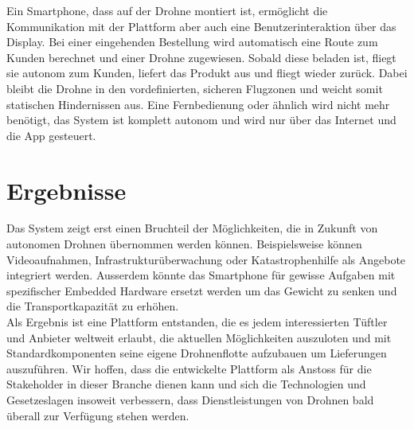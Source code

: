 Ein Smartphone, dass auf der Drohne montiert ist, ermöglicht die Kommunikation mit der Plattform aber auch eine Benutzerinteraktion über das Display. Bei einer eingehenden Bestellung wird automatisch eine Route zum Kunden berechnet und einer Drohne zugewiesen. Sobald diese beladen ist, fliegt sie autonom zum Kunden, liefert das Produkt aus und fliegt wieder zurück. Dabei bleibt die Drohne in den vordefinierten, sicheren Flugzonen und weicht somit statischen Hindernissen aus. Eine Fernbedienung oder ähnlich wird nicht mehr benötigt, das System ist komplett autonom und wird nur über das Internet und die App gesteuert.

\section*{Ergebnisse}
Das System zeigt erst einen Bruchteil der Möglichkeiten, die in Zukunft von autonomen Drohnen übernommen werden können. Beispielsweise können Videoaufnahmen, Infrastrukturüberwachung oder Katastrophenhilfe als Angebote integriert werden. Ausserdem könnte das Smartphone für gewisse Aufgaben mit spezifischer Embedded Hardware ersetzt werden um das Gewicht zu senken und die Transportkapazität zu erhöhen. \\

Als Ergebnis ist eine Plattform entstanden, die es jedem interessierten Tüftler und Anbieter weltweit erlaubt, die aktuellen Möglichkeiten auszuloten und mit Standardkomponenten seine eigene Drohnenflotte aufzubauen um Lieferungen auszuführen. Wir hoffen, dass die entwickelte Plattform als Anstoss für die Stakeholder in dieser Branche dienen kann und sich die Technologien und Gesetzeslagen insoweit verbessern, dass Dienstleistungen von Drohnen bald überall zur Verfügung stehen werden.
